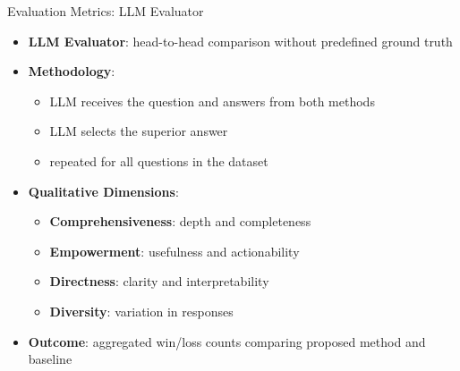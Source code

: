 \documentclass[aspectratio=169,xcolor=dvipsnames]{beamer}
\begin{document}
	\begin{frame}{Evaluation Metrics: LLM Evaluator}
		
		\scriptsize
		
		\begin{itemize}
			
			\item \textbf{\textcolor{blue!70}{LLM Evaluator}}:
			head-to-head comparison without predefined ground truth
			
			\vspace{0.2cm}
			
			\item \textbf{\textcolor{teal!80}{Methodology}}:
			\begin{itemize}
				\item LLM receives the question and answers from both methods
				\item LLM selects the superior answer
				\item repeated for all questions in the dataset
			\end{itemize}
			
			\vspace{0.25cm}
			
			\item \textbf{\textcolor{teal!80}{Qualitative Dimensions}}:
			\begin{itemize}
				\item \textbf{\textcolor{purple!80}{Comprehensiveness}}: depth and completeness
				\item \textbf{\textcolor{purple!80}{Empowerment}}: usefulness and actionability
				\item \textbf{\textcolor{purple!80}{Directness}}: clarity and interpretability
				\item \textbf{\textcolor{purple!80}{Diversity}}: variation in responses
			\end{itemize}
			
			\vspace{0.25cm}
			
			\item \textbf{\textcolor{gray!80}{Outcome}}:
			aggregated win/loss counts comparing proposed method and baseline
			
		\end{itemize}
		
	\end{frame}
	
\end{document}
